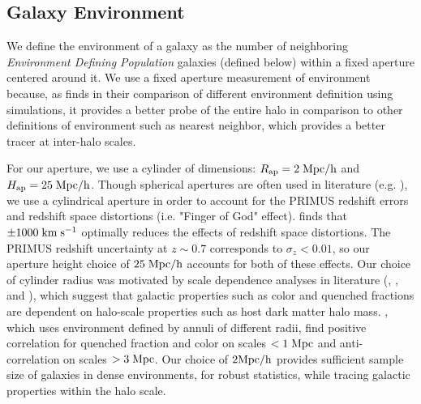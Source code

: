 \documentclass{emulateapj}
\begin{document}
\subsection{Galaxy Environment} \label{sec:environment}
We define the environment of a galaxy as the number of neighboring {\em Environment Defining Population} galaxies (defined below) within a fixed aperture centered around it. We use a fixed aperture measurement of environment because, as \cite{Muldrew:2012aa} finds in their comparison of different environment definition using simulations, it provides a better probe of the entire halo in comparison to other definitions of environment such as nearest neighbor, which provides a better tracer at inter-halo scales. 

For our aperture, we use a cylinder of dimensions: $R_{\rm{ap}} = 2 \; \rm{Mpc}/h$ and $H_{\rm{ap}} = 25 \; \rm{Mpc}/h$. Though spherical apertures are often used in literature (e.g. \cite{Croton:2005aa}), we use a cylindrical aperture in order to account for the PRIMUS redshift errors and redshift space distortions (i.e. "Finger of God" effect). \cite{Cooper:2005aa} finds that $\pm 1000 \; \rm{km} \; \rm{s^{-1}}$ optimally reduces the effects of redshift space distortions. The PRIMUS redshift uncertainty at $z \sim 0.7$ corresponds to $\sigma_z < 0.01$, so our aperture height choice of $25 \; \rm{Mpc}/h$ accounts for both of these effects. Our choice of cylinder radius was motivated by scale dependence analyses in literature (\cite{Blanton:2006aa}, \cite{Wilman:2010aa}, and \cite{Muldrew:2012aa}), which suggest that galactic properties such as color and quenched fractions are dependent on halo-scale properties such as host dark matter halo mass. \cite{Wilman:2010aa}, which uses environment defined by annuli of different radii, find positive correlation for quenched fraction and color on scales $< 1 \; \rm{Mpc}$ and anti-correlation on scales $> 3 \; \rm{Mpc}$. Our choice of $2 \rm{Mpc}/h$ provides sufficient sample size of galaxies in dense environments, for robust statistics, while tracing galactic properties within the halo scale. 

\end{document}
